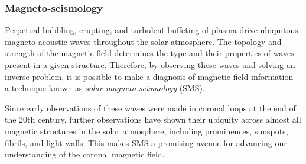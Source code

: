 \documentclass[12pt]{../style-files/ociamthesis}
\begin{document}
\subsubsection{Magneto-seismology}
Perpetual bubbling, erupting, and turbulent buffeting of plasma drive ubiquitous magneto-acoustic waves throughout the solar atmosphere. The topology and strength of the magnetic field determines the type  and their properties of waves present in a given structure. Therefore, by observing these waves and solving an inverse problem, it is possible to make a diagnosis of magnetic field information - a technique known as \textit{solar magneto-seismology} (SMS).

Since early observations of these waves were made in coronal loops at the end of the 20th century, further observations have shown their ubiquity across almost all magnetic structures in the solar atmosphere, including prominences, sunspots, fibrils, and light walls. This makes SMS a promising avenue for advancing our understanding of the coronal magnetic field.
\end{document}
